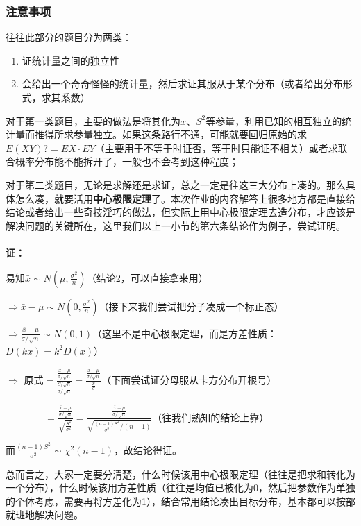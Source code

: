 \documentclass[10pt, a4paper]{article}
\begin{document}
\subsubsection{注意事项}
往往此部分的题目分为两类：
\begin{enumerate}
    \item 证统计量之间的独立性
    \item 会给出一个奇奇怪怪的统计量，然后求证其服从于某个分布（或者给出分布形式，求其系数）
\end{enumerate}\par
对于第一类题目，主要的做法是将其化为$\bar x$、$S^2$等参量，利用已知的相互独立的统计量而推得所求参量独立。如果这条路行不通，可能就要回归原始的求$E(XY)?=EX·EY$（主要用于不等于时证否，等于时只能证不相关）或者求联合概率分布能不能拆开了，一般也不会考到这种程度；\par
对于第二类题目，无论是求解还是求证，总之一定是往这三大分布上凑的。那么具体怎么凑，就要活用\textbf{中心极限定理}了。本次作业的内容解答上很多地方都是直接给结论或者给出一些奇技淫巧的做法，但实际上用中心极限定理去造分布，才应该是解决问题的关键所在，这里我们以上一小节的第六条结论作为例子，尝试证明。\\ \\
\textbf{证：}\par
$易知\bar{x}\sim N(\mu, \frac{\sigma^2}{n})$（结论2，可以直接拿来用）\par
$\Rightarrow \bar{x}-\mu \sim N(0, \frac{\sigma^2}{n})$（接下来我们尝试把分子凑成一个标正态）\par
$\Rightarrow \frac{\bar{x}-\mu}{\sigma / \sqrt n} \sim N(0, 1)$（这里不是中心极限定理，而是方差性质：$D(kx)=k^2D(x)$）\par
$\Rightarrow$ 原式$=\frac{\frac{\bar{x}-\mu}{\sigma / \sqrt n}}{\frac{S/\sqrt n}{\sigma / \sqrt n}}=\frac{\frac{\bar{x}-\mu}{\sigma / \sqrt n}}{\frac{S}{\sigma}}$（下面尝试证分母服从卡方分布开根号）\par
$\qquad \qquad =\frac{\frac{\bar{x}-\mu}{\sigma / \sqrt n}}{\sqrt{\frac{S^2}{\sigma^2}}}=\frac{\frac{\bar{x}-\mu}{\sigma / \sqrt n}}{\sqrt{\frac{(n-1)S^2}{\sigma^2}/(n-1)}}$（往我们熟知的结论上靠）\par
而$\frac{(n-1)S^2}{\sigma^2} \sim \chi^2(n-1)$，故结论得证。\\ \par
总而言之，大家一定要分清楚，什么时候该用中心极限定理（往往是把求和转化为一个分布），什么时候该用方差性质（往往是均值已被化为0，然后把参数作为单独的个体考虑，需要再将方差化为1），结合常用结论凑出目标分布，基本都可以按部就班地解决问题。
\end{document}
